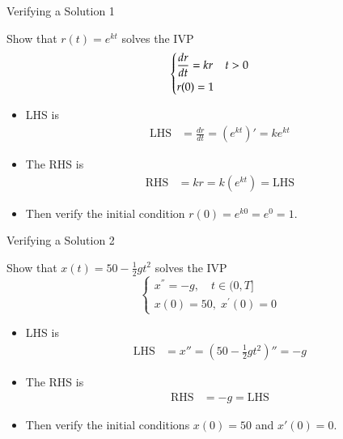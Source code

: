 \documentclass[10pt]{beamer}
\begin{document}
\begin{frame}{Verifying a Solution 1}
\begin{example}
    Show that $r(t)=e^{kt}$ solves the IVP
    $$\begin{dcases}
        \frac{dr}{dt} = kr  & t>0\\
           r(0) = 1 & 
    \end{dcases}$$
\end{example}
\begin{itemize}
    \item LHS is 
    \begin{align*}
        \text{LHS} &= \frac{dr}{dt} =(e^{kt})'= ke^{kt}
    \end{align*}
    \item The RHS is 
    \begin{align*}
        \text{RHS} &= kr= k(e^{kt})=\text{LHS}
    \end{align*}
    \item Then verify the initial condition $r(0) = e^{k0}=e^{0}=1.$
\end{itemize}
    
\end{frame}

\begin{frame}{Verifying a Solution 2}
\begin{example}
    Show that $x(t) = 50 - \frac{1}{2}gt^2$ solves the IVP
    $$\begin{cases}
x^{''} = -g, \quad t \in (0,T]\\
x(0) = 50,\; x^\prime(0) = 0
\end{cases}$$
\end{example}
\begin{itemize}
    \item LHS is 
    \begin{align*}
        \text{LHS} &= x'' =(50 - \frac{1}{2}gt^2)''= -g
    \end{align*}
    \item The RHS is 
    \begin{align*}
        \text{RHS} &=-g = \text{LHS}
    \end{align*}
    \item Then verify the initial conditions $x(0) = 50$ and $x'(0)=0.$ 
\end{itemize}
    
\end{frame}
\end{document}
